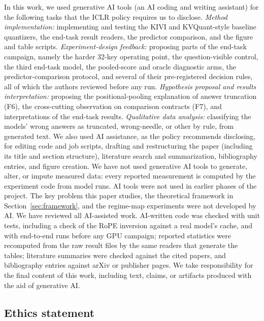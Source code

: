 \documentclass{article}
\newif\ifshowest \showesttrue
\DeclareRobustCommand{\estonly}[1]{\ifshowest#1\else\ifhmode\unskip\fi\fi}
\theoremstyle{definition}
\begin{document}
In this work, we used generative AI tools (an AI coding and writing assistant) for the following tasks that the ICLR policy requires us to disclose.
\emph{Method implementation:} implementing and testing the KIVI and KVQuant-style baseline quantizers, the end-task result readers, the predictor comparison, and the figure and table scripts.
\emph{Experiment-design feedback:} proposing parts of the end-task campaign, namely the harder 32-key operating point, the question-visible control, the third end-task model, the pooled-score and oracle diagnostic arms, the predictor-comparison protocol, and several of their pre-registered decision rules, all of which the authors reviewed before any run.
\emph{Hypothesis proposal and results interpretation:} proposing the positional-pooling explanation of answer truncation (F6), the cross-cutting observation on comparison contracts (F7), and interpretations of the end-task results.
\emph{Qualitative data analysis:} classifying the models' wrong answers as truncated, wrong-needle, or other by rule, from generated text.
We also used AI assistance, as the policy recommends disclosing, for editing code and job scripts, drafting and restructuring the paper (including its title and section structure), literature search and summarization, bibliography entries, and figure creation.
We have not used generative AI tools to generate, alter, or impute measured data: every reported measurement is computed by the experiment code from model runs.  
AI tools were not used in earlier phases of the project. The key problem this paper studies, the theoretical framework in Section~\ref{sec:framework}, and the regime-map experiments were not developed by AI. 
We have reviewed all AI-assisted work.  AI-written code was checked with unit tests, including a check of the RoPE inversion against a real model's cache, and with end-to-end runs before any GPU campaign; reported statistics were recomputed from the raw result files by the same readers that generate the tables; literature summaries were checked against the cited papers, and bibliography entries against arXiv or publisher pages.  We take responsibility for the final content of this work, including text, claims, or artifacts produced with the aid of generative AI.

\subsection*{Ethics statement}
\end{document}
